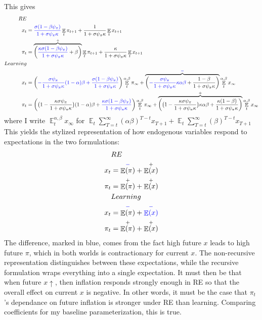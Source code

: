 \documentclass[11pt]{article}
\renewcommand{\[}{\begin{equation}}
\renewcommand{\]}{\end{equation}}
\DeclareMathOperator{\E}{\mathbb{E}}
\begin{document}
This gives
\begin{align*}
RE& \\
x_t &=  \textcolor{blue}{ \frac{\sigma(1-\beta\psi_{\pi})}{1+\sigma\psi_{\pi}\kappa}}\E_t \pi_{t+1}   +   \frac{1}{1+\sigma\psi_{\pi}\kappa}\E_t x_{t+1}  \\
\pi_t &=   \overbrace{\bigg( \textcolor{blue}{\frac{\kappa\sigma(1-\beta\psi_{\pi})}{1+\sigma\psi_{\pi}\kappa}}+\beta\bigg)}^{+}\E_t \pi_{t+1} +   \frac{\kappa}{1+\sigma\psi_{\pi}\kappa}\E_t x_{t+1} \\
Learning & \\
x_t & =  \bigg( \textcolor{blue}{-\frac{\sigma\psi_{\pi}}{1+\sigma\psi_{\pi}\kappa}(1-\alpha)\beta + \frac{\sigma(1-\beta\psi_{\pi})}{1+\sigma\psi_{\pi}\kappa}}\bigg) \E^{\alpha,\beta}_t \pi_{\infty} 
+\overbrace{\bigg( \textcolor{blue}{-\frac{\sigma\psi_{\pi}}{1+\sigma\psi_{\pi}\kappa}\kappa\alpha\beta} + \frac{1-\beta}{1+\sigma\psi_{\pi}\kappa}\bigg)}^{\textcolor{blue}{-}} \E^{\alpha,\beta}_t x_{\infty} \\
\pi_t & =  \bigg( \big(1-\frac{\kappa\sigma\psi_{\pi}}{1+\sigma\psi_{\pi}\kappa} \big)(1-\alpha)\beta + \textcolor{blue}{\frac{\kappa\sigma(1-\beta\psi_{\pi})}{1+\sigma\psi_{\pi}\kappa}}\bigg) \E^{\alpha,\beta}_t \pi_{\infty} 
+\overbrace{\bigg(   \big(1-\frac{\kappa\sigma\psi_{\pi}}{1+\sigma\psi_{\pi}\kappa} \big) \kappa\alpha\beta + \frac{\kappa(1-\beta)}{1+\sigma\psi_{\pi}\kappa}\bigg)}^{+} \E^{\alpha,\beta}_t x_{\infty} 
\end{align*}
where I write $\E^{\alpha,\beta}_t x_{\infty}$ for $\E_t\sum_{T=t}^{\infty} (\alpha\beta)^{T-t}x_{T+1} + \E_t\sum_{T=t}^{\infty} (\beta)^{T-t} x_{T+1}$
This yields the stylized representation of how endogenous variables respond to expectations in the two formulations:
\begin{align*}
& RE \\
x_t & = \overset{\textcolor{blue}{-}}{\E(\pi)} + \overset{+}{\E(x)} \\  
\pi_t & = \overset{+}{\E(\pi)} + \overset{+}{\E(x)} \\
& Learning \\
x_t & = \overset{\textcolor{blue}{-}}{\E(\pi)} + \textcolor{blue}{\overset{\textcolor{blue}{-}}{\E(x)} }\\  
\pi_t & = \overset{+}{\E(\pi)} + \overset{+}{\E(x)} \\
\end{align*}
The difference, marked in blue, comes from the fact high future $x$ leads to high future $\pi$, which in both worlds is contractionary for current $x$. The non-recursive representation distinguishes between these expectations, while the recursive formulation wraps everything into a single expectation. It must then be that when future $x\uparrow$, then inflation responds strongly enough in RE so that the overall effect on current $x$ is negative. In other words, it must be the case that $\pi_t$'s dependance on future inflation is stronger under RE than learning. Comparing coefficients for my baseline parameterization, this is true. 
\end{document}
